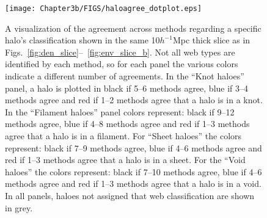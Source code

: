 \begin{figure}
\begin{minipage}[t]{.99\linewidth}

 \texttt{[image: Chapter3b/FIGS/haloagree\_dotplot.eps]}
 \vspace{-.4cm}
 \end{minipage}\hfill

 \caption{A visualization of the agreement across methods regarding a specific halo's classification shown in the same 10$h^{-1}$Mpc thick slice as in Figs.~\ref{fig:den_slice}--~\ref{fig:env_slice_b}. Not all web types are identified by each method, so for each panel the various colors indicate a different number of agreements. In the ``Knot haloes'' panel, a halo is plotted in black if 5--6 methods agree, blue if 3--4 methods agree and red if 1--2 methods agree that a halo is in a knot. In the ``Filament haloes'' panel colors represent: black if 9--12 methods agree, blue if 4--8 methods agree and red if 1--3 methods agree that a halo is in a filament. For ``Sheet haloes'' the colors represent: black if 7--9 methods agree, blue if 4--6 methods agree and red if 1--3 methods agree that a halo is in a sheet. For the ``Void haloes'' the colors represent: black if 7--10 methods agree, blue if 4--6 methods agree and red if 1--3 methods agree that a halo is in a void. In all panels, haloes not assigned that web classification are shown in grey. }
  \label{fig:halo_agree_dot}
\end{figure}


